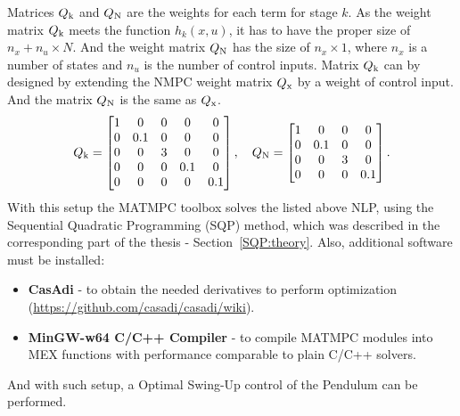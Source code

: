 Matrices $Q _{\text{k}}$ and $Q _{\text{N}}$ are the weights for each term for stage $k$. As the weight matrix $Q _{\text{k}}$ meets the function $h_k(x, u)$, it has to have the proper size of $n_x+n_u\times N$. And the weight matrix $Q _{\text{N}}$ has the size of $n_x\times 1$, where $n_x$ is a number of states and $n_u$ is the number of control inputs. Matrix $Q _{\text{k}}$ can by designed by extending the NMPC weight matrix $Q _{\text{x}}$ by a weight of control input. And the matrix $Q _{\text{N}}$ is the same as $Q _{\text{x}}$.
\begin{equation}\label{NLP:weights}
Q _{\text{k}} = \begin{bmatrix}
				1&0&0&0&0\\
				0&0.1&0&0&0\\
				0&0&3&0&0\\
				0&0&0&0.1&0\\
				0&0&0&0&0.1
			\end{bmatrix}, \quad 
Q _{\text{N}} = \begin{bmatrix}
				1&0&0&0\\
				0&0.1&0&0\\
				0&0&3&0\\
				0&0&0&0.1
			\end{bmatrix}.
\end{equation}
With this setup the \textsc{MATMPC} toolbox solves the listed above NLP, using the Sequential Quadratic Programming (SQP) method, which was described in the corresponding part of the thesis - Section~\ref{SQP:theory}. Also, additional software must be installed:
\begin{itemize}
	\item \textbf{CasAdi} - to obtain the needed derivatives to perform optimization (\url{https://github.com/casadi/casadi/wiki}).
	\item \textbf{MinGW-w64 C/C++ Compiler} - to compile \textsc{MATMPC} modules into MEX functions with performance comparable to plain C/C++ solvers.
\end{itemize}
And with such setup, a Optimal Swing-Up control of the Pendulum can be performed.
\newpage
